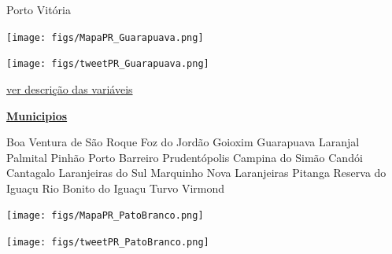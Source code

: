 \documentclass[10pt]{article} %
\begin{document}
\begin{minipage}[t]{.30\linewidth}
\begin{mdframed}[style=sidebar,frametitle={}]
\begin{itemize}
\gsquare Porto Vitória 
\end{itemize}\BackToContents\end{mdframed}\hfill\end{minipage}\newpage\begin{minipage}[t]{.66\linewidth}
\hypertarget{Grpv}{}
\texttt{[image: figs/MapaPR\_Guarapuava.png]}\vspace{0.5cm}\vspace{0.5cm}\begin{center}
\texttt{[image: figs/tweetPR\_Guarapuava.png]}\end{center}
\begin{center}

\end{center}
\small{\hyperlink{vartab}{ver descrição das variáveis}}\end{minipage}\hfill\begin{minipage}[t]{.30\linewidth}
\begin{mdframed}[style=sidebar,frametitle={}]
\textbf{\hyperlink{municips}{Municipios}}\begin{itemize}\gsquare Boa Ventura de São Roque 
\gsquare Foz do Jordão 
\gsquare Goioxim 
\gsquare Guarapuava 
\gsquare Laranjal 
\gsquare Palmital 
\gsquare Pinhão 
\gsquare Porto Barreiro 
\gsquare Prudentópolis 
\gsquare Campina do Simão 
\gsquare Candói 
\gsquare Cantagalo 
\gsquare Laranjeiras do Sul 
\gsquare Marquinho 
\gsquare Nova Laranjeiras 
\gsquare Pitanga 
\gsquare Reserva do Iguaçu 
\gsquare Rio Bonito do Iguaçu 
\gsquare Turvo 
\gsquare Virmond 
\end{itemize}\BackToContents\end{mdframed}\hfill\end{minipage}\newpage\begin{minipage}[t]{.66\linewidth}
\hypertarget{PtBr}{}
\texttt{[image: figs/MapaPR\_PatoBranco.png]}\vspace{0.5cm}\vspace{0.5cm}\begin{center}
\texttt{[image: figs/tweetPR\_PatoBranco.png]}\end{center}
\begin{center}

\end{center}
\end{minipage}
\end{document}
